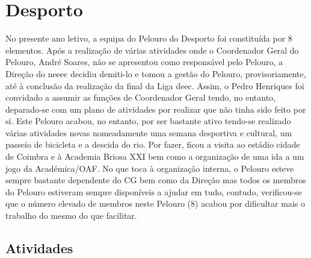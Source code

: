 
\section{Desporto}

No presente ano letivo, a equipa do Pelouro do Desporto foi constituída por 8 elementos. Após a realização de várias atividades onde o Coordenador Geral do Pelouro, André Soares, não se apresentou como responsável pelo Pelouro, a Direção do \acrshort{neeec} decidiu demiti-lo e tomou a gestão do Pelouro, provisoriamente, até à conclusão da realização da final da Liga \acrshort{deec}. Assim, o Pedro Henriques foi convidado a assumir as funções de Coordenador Geral tendo, no entanto, deparado-se com um plano de atividades por realizar que não tinha sido feito por si. Este Pelouro acabou, no entanto, por ser bastante ativo tendo-se realizado várias atividades novas nomeadamente uma semana desportiva e cultural, um passeio de bicicleta e a descida do rio. Por fazer, ficou a visita ao estádio cidade de Coimbra e à Academia Briosa XXI bem como a organização de uma ida a um jogo da Académica/OAF. No que toca à organização interna, o Pelouro esteve sempre bastante dependente do CG bem como da Direção mas todos os membros do Pelouro estiveram sempre disponíveis a ajudar em tudo, contudo, verificou-se que o número elevado de membros neste Pelouro (8) acabou por dificultar mais o trabalho do mesmo do que facilitar.

\subsection{Atividades}















